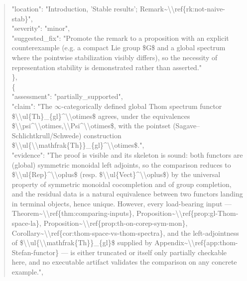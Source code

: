 \documentclass[11pt]{article}
\begin{document}
\begin{quote}
      "location": "Introduction, 'Stable results'; Remark\~{}\textbackslash{}\textbackslash{}ref\{rk:not-naive-stab\}",\\
      "severity": "minor",\\
      "suggested\_fix": "Promote the remark to a proposition with an explicit counterexample (e.g. a compact Lie group \$G\$ and a global spectrum where the pointwise stabilization visibly differs), so the necessity of representation stability is demonstrated rather than asserted."\\
    \},\\
    \{\\
      "assessment": "partially\_supported",\\
      "claim": "The \ensuremath{\infty}-categorically defined global Thom spectrum functor \$\textbackslash{}\textbackslash{}ul\{Th\}\_\{gl\}\^{}\textbackslash{}\textbackslash{}otimes\$ agrees, under the equivalences \$\textbackslash{}\textbackslash{}psi\^{}\textbackslash{}\textbackslash{}otimes,\textbackslash{}\textbackslash{}Psi\^{}\textbackslash{}\textbackslash{}otimes\$, with the pointset (Sagave--Schlichtkrull/Schwede) construction \$\textbackslash{}\textbackslash{}ul\{\textbackslash{}\textbackslash{}mathfrak\{Th\}\}\_\{gl\}\^{}\textbackslash{}\textbackslash{}otimes\$.",\\
      "evidence": "The proof is visible and its skeleton is sound: both functors are (global) symmetric monoidal left adjoints, so the comparison reduces to \$\textbackslash{}\textbackslash{}ul\{Rep\}\^{}\textbackslash{}\textbackslash{}oplus\$ (resp. \$\textbackslash{}\textbackslash{}ul\{Vect\}\^{}\textbackslash{}\textbackslash{}oplus\$) by the universal property of symmetric monoidal cocompletion and of group completion, and the residual data is a natural equivalence between two functors landing in terminal objects, hence unique. However, every load-bearing input --- Theorem\~{}\textbackslash{}\textbackslash{}ref\{thm:comparing-inputs\}, Proposition\~{}\textbackslash{}\textbackslash{}ref\{prop:gl-Thom-space-la\}, Proposition\~{}\textbackslash{}\textbackslash{}ref\{prop:th-on-corep-sym-mon\}, Corollary\~{}\textbackslash{}\textbackslash{}ref\{cor:thom-space-vs-thom-spectra\}, and the left-adjointness of \$\textbackslash{}\textbackslash{}ul\{\textbackslash{}\textbackslash{}mathfrak\{Th\}\}\_\{gl\}\$ supplied by Appendix\~{}\textbackslash{}\textbackslash{}ref\{app:thom-Stefan-functor\} --- is either truncated or itself only partially checkable here, and no executable artifact validates the comparison on any concrete example.",\\

\end{quote}
\end{document}
